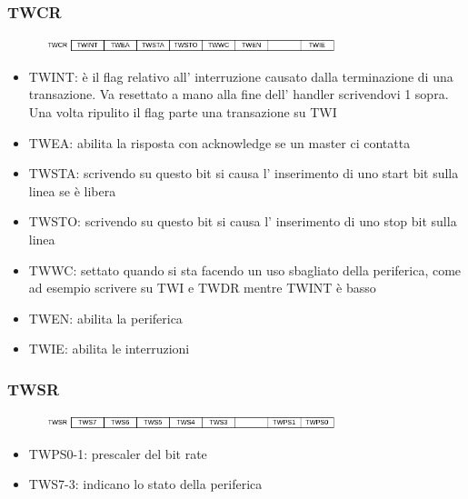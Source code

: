\subsubsection{TWCR}
\begin{figure}[H]
    \centering
    \includegraphics[width=320px]{images/24_I2C-TWI/TWCR.png}
\end{figure}
\begin{itemize}
    \item TWINT: è il flag relativo all' interruzione causato dalla terminazione di una transazione. Va resettato a mano alla fine dell' handler scrivendovi 1 sopra.
    Una volta ripulito il flag parte una transazione su TWI
    
    \item TWEA: abilita la risposta con acknowledge se un master ci contatta
    
    \item TWSTA: scrivendo su questo bit si causa l' inserimento di uno start bit sulla linea se è libera
    
    \item TWSTO: scrivendo su questo bit si causa l' inserimento di uno stop bit sulla linea
    
    \item TWWC: settato quando si sta facendo un uso sbagliato della periferica, come ad esempio scrivere su TWI e TWDR mentre TWINT è basso
    
    \item TWEN: abilita la periferica
    
    \item TWIE: abilita le interruzioni
\end{itemize}

\subsubsection{TWSR}
\begin{figure}[H]
    \centering
    \includegraphics[width=320px]{images/24_I2C-TWI/TWSR.png}
\end{figure}
\begin{itemize}
    \item TWPS0-1: prescaler del bit rate
    \item TWS7-3: indicano lo stato della periferica
\end{itemize}

